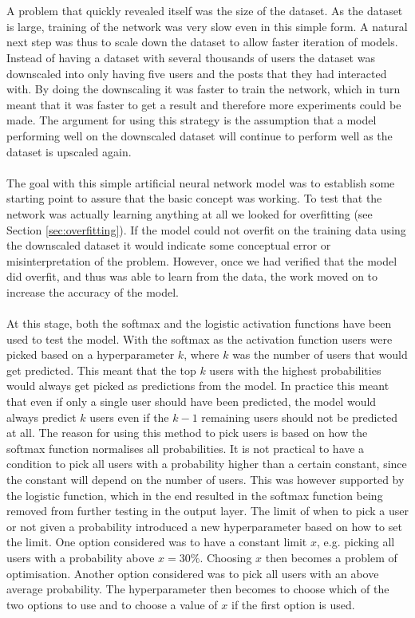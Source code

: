 \\\\
A problem that quickly revealed itself was the size of the dataset. As the dataset is large, training of the network was very slow even in this simple form. A natural next step was thus to scale down the dataset to allow faster iteration of models. Instead of having a dataset with several thousands of users the dataset was downscaled into only having five users and the posts that they had interacted with. By doing the downscaling it was faster to train the network, which in turn meant that it was faster to get a result and therefore more experiments could be made. The argument for using this strategy is the assumption that a model performing well on the downscaled dataset will continue to perform well as the dataset is upscaled again. 
\\\\
The goal with this simple artificial neural network model was to establish some starting point to assure that the basic concept was working. To test that the network was actually learning anything at all we looked for overfitting (see Section \ref{sec:overfitting}). If the model could not overfit on the training data using the downscaled dataset it would indicate some conceptual error or misinterpretation of the problem. However, once we had verified that the model did overfit, and thus was able to learn from the data, the work moved on to increase the accuracy of the model.
\\\\
At this stage, both the softmax and the logistic activation functions have been used to test the model. With the softmax as the activation function users were picked based on a hyperparameter $k$, where $k$ was the number of users that would get predicted. This meant that the top $k$ users with the highest probabilities would always get picked as predictions from the model. In practice this meant that even if only a single user should have been predicted, the model would always predict $k$ users even if the $k-1$ remaining users should not be predicted at all. The reason for using this method to pick users is based on how the softmax function normalises all probabilities. It is not practical to have a condition to pick all users with a probability higher than a certain constant, since the constant will depend on the number of users. This was however supported by the logistic function, which in the end resulted in the softmax function being removed from further testing in the output layer. The limit of when to pick a user or not given a probability introduced a new hyperparameter based on how to set the limit. One option considered was to have a constant limit $x$, e.g. picking all users with a probability above $x=30\%$. Choosing $x$ then becomes a problem of optimisation. Another option considered was to pick all users with an above average probability. The hyperparameter then becomes to choose which of the two options to use and to choose a value of $x$ if the first option is used.
